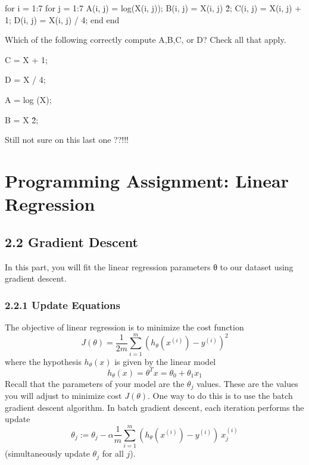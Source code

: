 \documentclass[11pt,a4paper]{article}
\begin{document}
for i = 1:7
  for j = 1:7
    A(i, j) = log(X(i, j));
    B(i, j) = X(i, j) \^ 2;
    C(i, j) = X(i, j) + 1;
    D(i, j) = X(i, j) / 4;
  end
end

Which of the following correctly compute A,B,C, or D? Check all that apply.


C = X + 1;

D = X / 4;

A = log (X);

B = X \^ 2;

Still not sure on this last one ??!!!




\section{Programming Assignment: Linear Regression}

\subsection*{2.2 Gradient Descent}
In this part, you will fit the linear regression parameters θ to our
dataset using gradient descent.

\subsubsection*{2.2.1 Update Equations}
The objective of linear regression is to minimize the cost function
\begin{equation}
J(\theta) = \frac{1}{2m} \sum_{i=1}^{m} (h_{\theta} (x^{(i)}) - y^{(i)})^{2}
\end{equation}
where the hypothesis $h_{\theta}(x)$ is given by the linear model
\begin{equation}
h_{\theta}(x) = \theta^{T} x = \theta_{0} + \theta_{1} x_{1}
\end{equation}
Recall that the parameters of your model are the $\theta_{j}$
values. These are the values you will adjust to minimize cost
$J(\theta)$. One way to do this is to use the batch gradient descent
algorithm. In batch gradient descent, each iteration performs the
update
\begin{equation}
 \theta_{j} :=   \theta_{j} - \alpha \frac{1}{m}\sum_{i=1}^{m} (h_{\theta} (x^{(i)}) - y^{(i)}) \   x^{(i)}_{j}
\end{equation}
(simultaneously update $\theta_{j}$ for all $j$).
\end{document}
